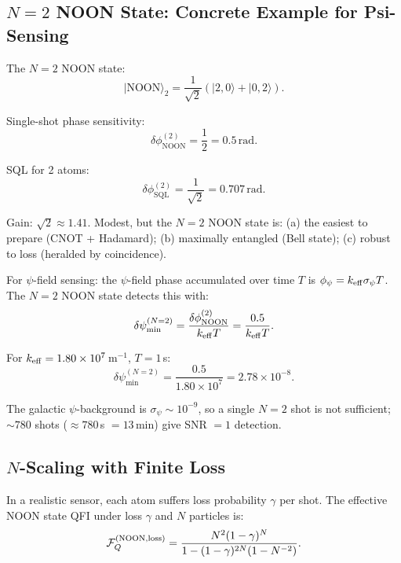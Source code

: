 \documentclass[11pt]{article}
\theoremstyle{definition}
\theoremstyle{remark}
\begin{document}
\subsection{$N=2$ NOON State: Concrete Example for Psi-Sensing}

The $N=2$ NOON state:
\begin{equation}
|\mathrm{NOON}\rangle_2 = \frac{1}{\sqrt{2}}\left(|2,0\rangle + |0,2\rangle\right).
\end{equation}

Single-shot phase sensitivity:
\begin{equation}
\delta\phi_{\mathrm{NOON}}^{(2)} = \frac{1}{2} = 0.5\,\mathrm{rad}.
\end{equation}

SQL for 2 atoms:
\begin{equation}
\delta\phi_{\mathrm{SQL}}^{(2)} = \frac{1}{\sqrt{2}} = 0.707\,\mathrm{rad}.
\end{equation}

Gain: $\sqrt{2} \approx 1.41$. Modest, but the $N=2$ NOON state is:
(a) the easiest to prepare (CNOT + Hadamard); (b) maximally entangled
(Bell state); (c) robust to loss (heralded by coincidence).

For $\psi$-field sensing: the $\psi$-field phase accumulated over time $T$
is $\phi_\psi = k_{\rm eff} \sigma_\psi T$. The $N=2$ NOON state detects this
with:
\begin{equation}
\delta\psi_{\min}^{(N=2)} = \frac{\delta\phi_{\mathrm{NOON}}^{(2)}}{k_{\rm eff} T}
= \frac{0.5}{k_{\rm eff} T}.
\end{equation}

For $k_{\rm eff} = 1.80\times10^7$\,m$^{-1}$, $T = 1$\,s:
\begin{equation}
\delta\psi_{\min}^{(N=2)} = \frac{0.5}{1.80\times10^7}
= 2.78\times10^{-8}.
\end{equation}

The galactic $\psi$-background is $\sigma_\psi \sim 10^{-9}$, so a single
$N=2$ shot is not sufficient; $\sim 780$ shots ($\approx 780$\,s $= 13$\,min)
give SNR $= 1$ detection.

\subsection{$N$-Scaling with Finite Loss}

In a realistic sensor, each atom suffers loss probability $\gamma$ per shot.
The effective NOON state QFI under loss $\gamma$ and $N$ particles is:
\begin{equation}
\mathcal{F}_Q^{(\rm NOON, loss)} = \frac{N^2 (1-\gamma)^N}{1 - (1-\gamma)^{2N}(1 - N^{-2})}.
\label{eq:noon-loss}
\end{equation}
\end{document}
